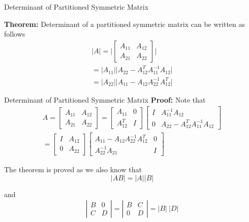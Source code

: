 \documentclass{beamer}
\begin{document}
\begin{frame}{Determinant of Partitioned Symmetric Matrix}
	
	\textbf{Theorem:} Determinant of a partitioned symmetric matrix can be written as follows
	\begin{gather}
	\vert A \vert 
	= \bigg| 
	\begin{bmatrix}
	A_{11}&A_{12}\\
	A_{21}&A_{22}
	\end{bmatrix}
	\bigg| \\
	=\vert A_{11}\vert \vert A_{22}-A_{12}^TA_{11}^{-1}A_{12}\vert \\
	=\vert A_{22}\vert \vert
	A_{11}-A_{12}A_{22}^{-1}A_{12}^T \vert 
	\end{gather}
\end{frame}

\begin{frame}{Determinant of Partitioned Symmetric Matrix}
	\textbf{Proof:} Note that
	\begin{gather}
	A = 
	\begin{bmatrix}
	A_{11}&A_{12} \\
	A_{21}&A_{22}
	\end{bmatrix}
	= 
	\begin{bmatrix}
	A_{11}& 0 \\
	A_{12}^T& I
	\end{bmatrix}
	\begin{bmatrix}
	I & A_{11}^{-1}A_{12} \\
	0 & A_{22} - A_{12}^TA_{11}^{-1}A_{12}
	\end{bmatrix}\\
	= 
	\begin{bmatrix}
	I & A_{12} \\
	0 & A_{22}
	\end{bmatrix}
	\begin{bmatrix}
	A_{11} - A_{12}A_{22}^{-1}A_{12}^T & 0\\
	A_{22}^{-1}A_{21}  & I
	\end{bmatrix}
	\end{gather} 
	
	The theorem is proved as we also know that
	\begin{equation}
	\vert AB\vert=\vert A\vert  \vert B\vert 
	\end{equation}
	
	and
	\begin{equation}
	\left\vert 
	\begin{matrix}
	B&0 \\
	C&D
	\end{matrix} 
	\right\vert
	=
	\left\vert 
	\begin{matrix}
	B&C \\
	0&D
	\end{matrix} 
	\right\vert
	=
	\vert B\vert\
	\vert D\vert 
	\end{equation}	
\end{frame}
\end{document}
